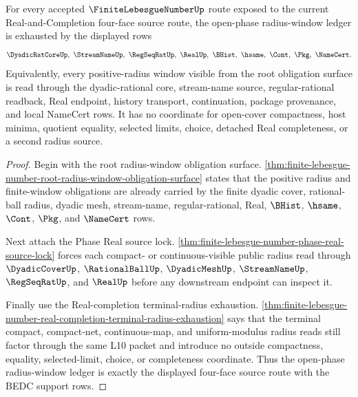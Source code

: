 \begin{theorem}
\label{thm:finite-lebesgue-number-open-phase-radius-window-exhaustion}
For every accepted $\FiniteLebesgueNumberUp$ route exposed to the current Real-and-Completion four-face source route, the open-phase radius-window ledger is exhausted by the displayed rows
$$
\DyadicRatCoreUp,\ \StreamNameUp,\ \RegSeqRatUp,\ \RealUp,\ \BHist,\ \hsame,\ \Cont,\ \Pkg,\ \NameCert .
$$
Equivalently, every positive-radius window visible from the root obligation surface is read through the dyadic-rational core, stream-name source, regular-rational readback, Real endpoint, history transport, continuation, package provenance, and local NameCert rows. It has no coordinate for open-cover compactness, host minima, quotient equality, selected limits, choice, detached Real completeness, or a second radius source.
\end{theorem}
\begin{proof}
Begin with the root radius-window obligation surface. \autoref{thm:finite-lebesgue-number-root-radius-window-obligation-surface} states that the positive radius and finite-window obligations are already carried by the finite dyadic cover, rational-ball radius, dyadic mesh, stream-name, regular-rational, Real, $\BHist$, $\hsame$, $\Cont$, $\Pkg$, and $\NameCert$ rows.

Next attach the Phase Real source lock. \autoref{thm:finite-lebesgue-number-phase-real-source-lock} forces each compact- or continuous-visible public radius read through $\DyadicCoverUp$, $\RationalBallUp$, $\DyadicMeshUp$, $\StreamNameUp$, $\RegSeqRatUp$, and $\RealUp$ before any downstream endpoint can inspect it.

Finally use the Real-completion terminal-radius exhaustion. \autoref{thm:finite-lebesgue-number-real-completion-terminal-radius-exhaustion} says that the terminal compact, compact-net, continuous-map, and uniform-modulus radius reads still factor through the same L10 packet and introduce no outside compactness, equality, selected-limit, choice, or completeness coordinate. Thus the open-phase radius-window ledger is exactly the displayed four-face source route with the BEDC support rows.
\end{proof}

